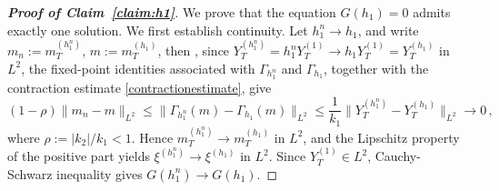 \documentclass[11pt,a4paper]{article}
\begin{document}
\begin{proof}[\textup{\textbf{Proof of Claim~\ref{claim:h1}}}]

We prove that the equation \(G(h_1)=0\) admits exactly one solution. We first establish continuity. Let \(h_1^n\to h_1\), and write \(m_n:=m_T^{(h_1^n)}\), \(m:=m_T^{(h_1)}\), then , since \(Y_T^{(h_1^n)}=h_1^nY_T^{(1)}\to h_1Y_T^{(1)}=Y_T^{(h_1)}\) in \(L^2\), the fixed-point identities associated with \(\Gamma_{h_1^n}\) and \(\Gamma_{h_1}\), together with the contraction estimate \eqref{contractionestimate}, give
\[
(1-\rho)\|m_n-m\|_{L^2}
\le
\|\Gamma_{h_1^n}(m)-\Gamma_{h_1}(m)\|_{L^2}
\le
\frac1{k_1}\|Y_T^{(h_1^n)}-Y_T^{(h_1)}\|_{L^2}\to0\,,
\]
where \(\rho:=|k_2|/k_1<1\). Hence \(m_T^{(h_1^n)}\to m_T^{(h_1)}\) in \(L^2\), and the Lipschitz property of the positive part yields \(\xi^{(h_1^n)}\to \xi^{(h_1)}\) in \(L^2\). Since \(Y_T^{(1)}\in L^2\), Cauchy-Schwarz inequality gives \(G(h_1^n)\to G(h_1)\).


\end{proof}
\end{document}
